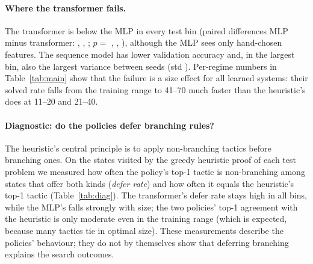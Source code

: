 \paragraph{Where the transformer fails.} The transformer is below the MLP in every test bin (paired differences MLP minus transformer: , , ; $p=$ , , ), although the MLP sees only hand-chosen features. The sequence model has lower validation accuracy and, in the largest bin, also the largest variance between seeds (std ). Per-regime numbers in Table~\ref{tab:main} show that the failure is a size effect for all learned systems: their solved rate falls from the training range to 41--70 much faster than the heuristic's does at 11--20 and 21--40.

\paragraph{Diagnostic: do the policies defer branching rules?} The heuristic's central principle is to apply non-branching tactics before branching ones. On the states visited by the greedy heuristic proof of each test problem we measured how often the policy's top-1 tactic is non-branching among states that offer both kinds (\emph{defer rate}) and how often it equals the heuristic's top-1 tactic (Table~\ref{tab:diag}). The transformer's defer rate stays high in all bins, while the MLP's falls strongly with size; the two policies' top-1 agreement with the heuristic is only moderate even in the training range (which is expected, because many tactics tie in optimal size). These measurements describe the policies' behaviour; they do not by themselves show that deferring branching explains the search outcomes.

\begin{table}[t]\centering\caption{Diagnostic on heuristic-proof states: top-1 agreement with the heuristic and defer rate (non-branching preferred when both kinds are available). Mean $\pm$ std over seeds; bold/underline marks in this table are not meaningful.}\label{tab:diag}
\resizebox{\columnwidth}{!}{}
\end{table}
